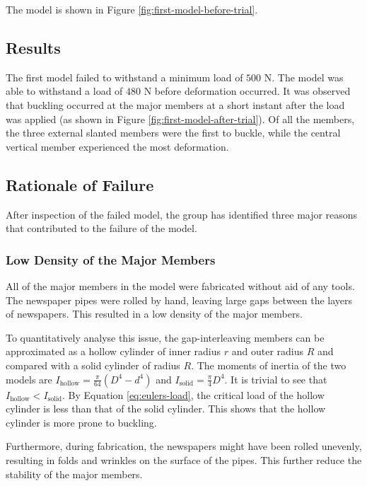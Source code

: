 \documentclass[fleqn,10pt]{SelfArx} %
\begin{document}
The model is shown in Figure \ref{fig:first-model-before-trial}.

\subsection{Results}

The first model failed to withstand a minimum load of $500\text{ N}$. The model was
	able to withstand a load of $480\text{ N}$ before deformation occurred.
	It was observed that buckling occurred at the major members at a short instant
	after the load was applied (as shown in Figure \ref{fig:first-model-after-trial}).
	Of all the members, the three external slanted members were the first to buckle,
	while the central vertical member experienced the most deformation.

\subsection{Rationale of Failure}

After inspection of the failed model, the group has identified three major reasons
	that contributed to the failure of the model.

\subsubsection{Low Density of the Major Members}

All of the major members in the model were fabricated without aid of any tools. The
	newspaper pipes were rolled by hand, leaving large gaps between the layers of
	newspapers. This resulted in a low density of the major members.

To quantitatively analyse this issue, the gap-interleaving members can
	be approximated as a hollow cylinder of inner radius $r$ and outer radius $R$ and
	compared with a solid cylinder of radius $R$.
	The moments of inertia of the two models are
	$I_\text{hollow} = \frac{\pi}{64}(D^4 - d^4)$ and $I_\text{solid} = \frac{\pi}{4}D^4$.
	It is trivial to see that $I_\text{hollow} < I_\text{solid}$.
	By Equation \ref{eq:eulers-load}, the critical load of the hollow cylinder is
	less than that of the solid cylinder. This shows that the hollow cylinder is more
	prone to buckling.

Furthermore, during fabrication, the newspapers might have been rolled unevenly, resulting
	in folds and wrinkles on the surface of the pipes. This further reduce the stability of
	the major members.
\end{document}
